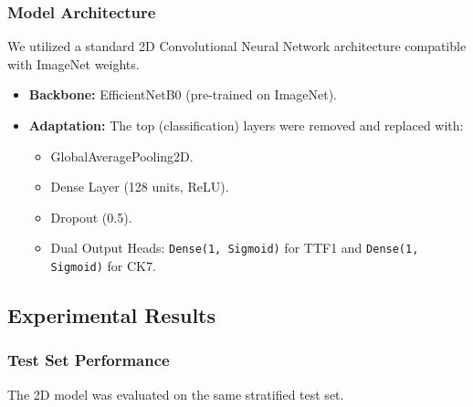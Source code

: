 \subsubsection{Model Architecture}
We utilized a standard 2D Convolutional Neural Network architecture compatible with ImageNet weights.
\begin{itemize}
    \item \textbf{Backbone:} EfficientNetB0 (pre-trained on ImageNet).
    \item \textbf{Adaptation:} The top (classification) layers were removed and replaced with:
    \begin{itemize}
        \item GlobalAveragePooling2D.
        \item Dense Layer (128 units, ReLU).
        \item Dropout (0.5).
        \item Dual Output Heads: \texttt{Dense(1, Sigmoid)} for TTF1 and \texttt{Dense(1, Sigmoid)} for CK7.
    \end{itemize}
\end{itemize}

\subsection{Experimental Results}

\subsubsection{Test Set Performance}
The 2D model was evaluated on the same stratified test set.

